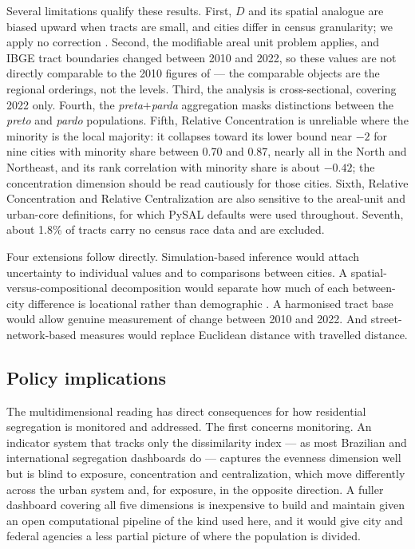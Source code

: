 \documentclass[pdflatex,sn-basic]{sn-jnl}%
\begin{document}
Several limitations qualify these results. First, $D$ and its spatial analogue are biased upward when tracts are small, and cities differ in census granularity; we apply no correction \citep{cortese1976further, carrington1997measuring, allen2015more}. Second, the modifiable areal unit problem applies, and IBGE tract boundaries changed between 2010 and 2022, so these values are not directly comparable to the 2010 figures of \citet{deSouza2023nationwide_english} --- the comparable objects are the regional orderings, not the levels. Third, the analysis is cross-sectional, covering 2022 only. Fourth, the \emph{preta}$+$\emph{parda} aggregation masks distinctions between the \emph{preto} and \emph{pardo} populations. Fifth, Relative Concentration is unreliable where the minority is the local majority: it collapses toward its lower bound near $-2$ for nine cities with minority share between 0.70 and 0.87, nearly all in the North and Northeast, and its rank correlation with minority share is about $-0.42$; the concentration dimension should be read cautiously for those cities. Sixth, Relative Concentration and Relative Centralization are also sensitive to the areal-unit and urban-core definitions, for which PySAL defaults were used throughout. Seventh, about 1.8\% of tracts carry no census race data and are excluded.

Four extensions follow directly. Simulation-based inference would attach uncertainty to individual values and to comparisons between cities. A spatial-versus-compositional decomposition would separate how much of each between-city difference is locational rather than demographic \citep{rey2021comparative}. A harmonised tract base would allow genuine measurement of change between 2010 and 2022. And street-network-based measures would replace Euclidean distance with travelled distance.

\subsection{Policy implications}\label{sec:policy}

The multidimensional reading has direct consequences for how residential segregation is monitored and addressed. The first concerns monitoring. An indicator system that tracks only the dissimilarity index --- as most Brazilian and international segregation dashboards do --- captures the evenness dimension well but is blind to exposure, concentration and centralization, which move differently across the urban system and, for exposure, in the opposite direction. A fuller dashboard covering all five dimensions is inexpensive to build and maintain given an open computational pipeline of the kind used here, and it would give city and federal agencies a less partial picture of where the population is divided.
\end{document}
